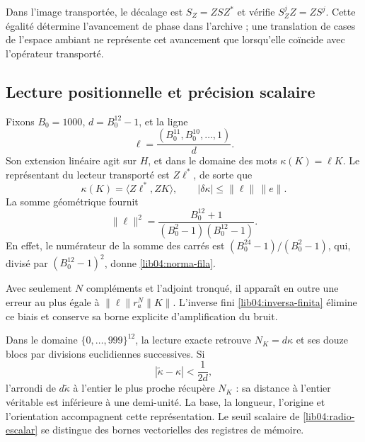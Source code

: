 Dans l’image transportée, le décalage est
\(S_Z=ZSZ^*\) et vérifie \(S_Z^jZ=ZS^j\). Cette égalité
détermine l’avancement de phase dans l’archive ; une translation de cases
de l’espace ambiant ne représente cet avancement que lorsqu’elle coïncide avec
l’opérateur transporté.

\subsection{Lecture positionnelle et précision scalaire}
\label{lib04:kappa}

Fixons \(B_0=1000\), \(d=B_0^{12}-1\), et la ligne
\begin{equation}
 \ell=\frac{(B_0^{11},B_0^{10},\ldots,1)}{d}.
 \label{lib04:fila-posicional}
\end{equation}
Son extension linéaire agit sur \(H\), et dans le domaine des mots \(\kappa(K)=\ell K\). Le représentant du lecteur transporté est \(Z\ell^*\), de sorte que
\begin{equation}
 \kappa(K)=\langle Z\ell^*,ZK\rangle,\qquad
 |\delta\kappa|\leq\|\ell\|\,\|e\|.
 \label{lib04:lectura-kappa}
\end{equation}
La somme géométrique fournit
\begin{equation}
 \|\ell\|^2
 =\frac{B_0^{12}+1}{(B_0^2-1)(B_0^{12}-1)}.
 \label{lib04:norma-fila}
\end{equation}
En effet, le numérateur de la somme des carrés est
\((B_0^{24}-1)/(B_0^2-1)\), qui, divisé par
\((B_0^{12}-1)^2\), donne \eqref{lib04:norma-fila}.

Avec seulement \(N\) compléments et l’adjoint tronqué, il apparaît en outre
une erreur au plus égale à \(\|\ell\|r_a^N\|K\|\). L’inverse fini
\eqref{lib04:inversa-finita} élimine ce biais et conserve sa borne
explicite d’amplification du bruit.

Dans le domaine \(\{0,\ldots,999\}^{12}\), la lecture exacte
retrouve \(N_K=d\kappa\) et ses douze blocs par divisions
euclidiennes successives. Si
\begin{equation}
 |\widetilde\kappa-\kappa|<\frac1{2d},
 \label{lib04:radio-escalar}
\end{equation}
l'arrondi de \(d\widetilde\kappa\) à l'entier le plus proche récupère \(N_K\) : sa distance à l'entier véritable est inférieure à une demi-unité. La base, la longueur, l'origine et l'orientation accompagnent cette représentation. Le seuil scalaire de \eqref{lib04:radio-escalar} se distingue des bornes vectorielles des registres de mémoire.

